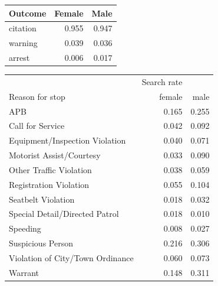 \documentclass{article}
\begin{document}
\begin{tabular}{lrr}
\toprule
 Outcome & Female &  Male \\
\midrule
citation &  0.955 & 0.947 \\
 warning &  0.039 & 0.036 \\
  arrest &  0.006 & 0.017 \\
\bottomrule
\end{tabular}


\begin{tabular}{lrr}
\toprule
{} &  Search rate & \\
Reason for stop                 &  female       &   male    \\
\midrule
APB                              &   0.165 & 0.255 \\
Call for Service                 &   0.042 & 0.092 \\
Equipment/Inspection Violation   &   0.040 & 0.071 \\
Motorist Assist/Courtesy         &   0.033 & 0.090 \\
Other Traffic Violation          &   0.038 & 0.059 \\
Registration Violation           &   0.055 & 0.104 \\
Seatbelt Violation               &   0.018 & 0.032 \\
Special Detail/Directed Patrol   &   0.018 & 0.010 \\
Speeding                         &   0.008 & 0.027 \\
Suspicious Person                &   0.216 & 0.306 \\
Violation of City/Town Ordinance &   0.060 & 0.073 \\
Warrant                          &   0.148 & 0.311 \\
\bottomrule
\end{tabular}
\end{document}
